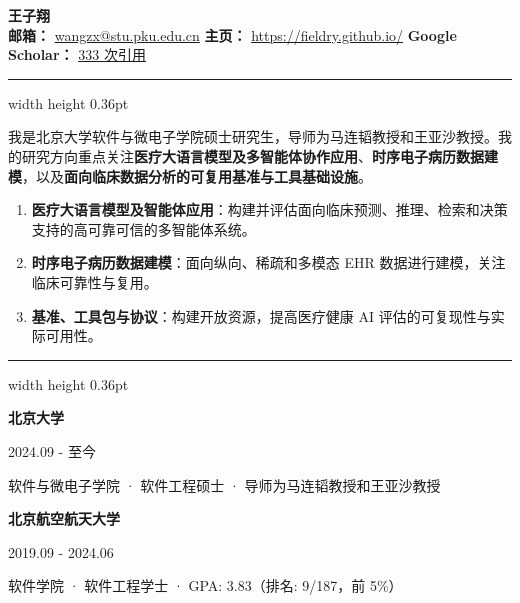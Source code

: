 \documentclass[10pt,a4paper]{article}
\newcommand{\sectiontitle}[1]{%
    \par\vspace{2.6mm}%
    \noindent{\Large\textbf{#1}}\par
    \vspace{0.9mm}%
    \hrule width \textwidth height 0.36pt
    \vspace{1.85mm}%
}
\newcommand{\entryhead}[2]{
    \noindent
    \begin{minipage}[t]{0.82\textwidth}
    \raggedright #1
    \end{minipage}
    \hfill
    \begin{minipage}[t]{0.16\textwidth}
    \raggedleft\footnotesize\textcolor{mutedgray}{#2}
    \end{minipage}
    \par
}
\newcommand{\educationentry}[3]{
    \entryhead{#1}{#2}
    {\small #3\par}
    \vspace{1mm}
}
\begin{document}
\begin{center}
{\huge\textbf{王子翔}}\\
\vspace{1.2mm}
\textbf{邮箱：} \href{mailto:wangzx@stu.pku.edu.cn}{wangzx@stu.pku.edu.cn}\hspace{5mm}
\textbf{主页：} \href{https://fieldry.github.io/}{https://fieldry.github.io/}\hspace{5mm}
\textbf{Google Scholar：} \href{https://scholar.google.com/citations?user=U73PSFAAAAAJ}{333 次引用}
\end{center}
\vspace{-0.4mm}

\sectiontitle{研究方向}
{\small 我是北京大学软件与微电子学院硕士研究生，导师为马连韬教授和王亚沙教授。我的研究方向重点关注\textbf{医疗大语言模型及多智能体协作应用}、\textbf{时序电子病历数据建模}，以及\textbf{面向临床数据分析的可复用基准与工具基础设施}。\par}
\begin{enumerate}[label=(\arabic*)]
\item {\small\textbf{医疗大语言模型及智能体应用}：构建并评估面向临床预测、推理、检索和决策支持的高可靠可信的多智能体系统。}
\item {\small\textbf{时序电子病历数据建模}：面向纵向、稀疏和多模态 EHR 数据进行建模，关注临床可靠性与复用。}
\item {\small\textbf{基准、工具包与协议}：构建开放资源，提高医疗健康 AI 评估的可复现性与实际可用性。}
\end{enumerate}

\sectiontitle{教育经历}
\educationentry{\textbf{北京大学}}{2024.09 - 至今}{软件与微电子学院 · 软件工程硕士 · 导师为马连韬教授和王亚沙教授\par}
\educationentry{\textbf{北京航空航天大学}}{2019.09 - 2024.06}{软件学院 · 软件工程学士 · GPA: 3.83（排名: 9/187，前 5\%）\par}
\end{document}
